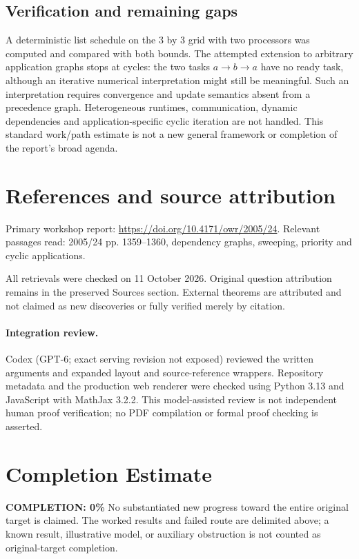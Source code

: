 \documentclass[11pt]{article}
\begin{document}
\subsection{Verification and remaining gaps}
A deterministic list schedule on the $3$ by $3$ grid with two processors was computed and compared with both bounds. The attempted extension to arbitrary application graphs stops at cycles: the two tasks $a\to b\to a$ have no ready task, although an iterative numerical interpretation might still be meaningful. Such an interpretation requires convergence and update semantics absent from a precedence graph. Heterogeneous runtimes, communication, dynamic dependencies and application-specific cyclic iteration are not handled. This standard work/path estimate is not a new general framework or completion of the report's broad agenda.

\section{References and source attribution}
Primary workshop report: \url{https://doi.org/10.4171/owr/2005/24}. Relevant passages read: 2005/24 pp. 1359--1360, dependency graphs, sweeping, priority and cyclic applications.

All retrievals were checked on 11 October 2026. Original question attribution remains in the preserved Sources section. External theorems are attributed and not claimed as new discoveries or fully verified merely by citation.


\paragraph{Integration review.} Codex (GPT-6; exact serving revision not exposed) reviewed the written arguments and expanded layout and source-reference wrappers. Repository metadata and the production web renderer were checked using Python 3.13 and JavaScript with MathJax 3.2.2. This model-assisted review is not independent human proof verification; no PDF compilation or formal proof checking is asserted.

\section{Completion Estimate}
\noindent\textbf{COMPLETION: 0\%}
No substantiated new progress toward the entire original target is claimed. The worked results and failed route are delimited above; a known result, illustrative model, or auxiliary obstruction is not counted as original-target completion.
\end{document}
